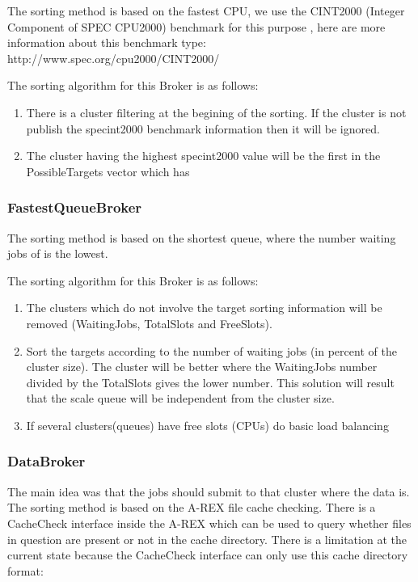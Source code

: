 \documentclass{book}
\begin{document}
The sorting method is based on the fastest CPU, we use the CINT2000 (Integer Component of SPEC CPU2000) benchmark for this purpose , here are more information about this benchmark type: http://www.spec.org/cpu2000/CINT2000/

The sorting algorithm for this Broker is as follows:

\begin{enumerate}
\item{There is a cluster filtering at the begining of the sorting. If the cluster is not publish the specint2000 benchmark information then it will be ignored.}
\item{The cluster having the highest specint2000 value will be the first in the PossibleTargets vector which has }
\end{enumerate}

\subsubsection{FastestQueueBroker}

The sorting method is based on the shortest queue, where the number waiting jobs  of  is the lowest. 

The sorting algorithm for this Broker is as follows:

\begin{enumerate}
\item{The clusters which do not involve the target sorting information will be removed  (WaitingJobs, TotalSlots and FreeSlots).}
\item{Sort the targets according to the number of waiting jobs (in percent of the cluster size). The cluster will be better where the WaitingJobs number divided by the TotalSlots gives the lower number. This solution will result that the scale queue will be independent from the cluster size.}
\item{If several clusters(queues) have free slots (CPUs) do basic load balancing}
\end{enumerate}

\subsubsection{DataBroker}

The main idea was that the jobs should submit to that cluster where the data is. The sorting method is based on the A-REX file cache checking. There is a CacheCheck interface inside the A-REX which can be used to query whether files in question are present or not in the cache directory. There is a limitation at the current state because the CacheCheck interface can only use this cache directory format: 
\end{document}
